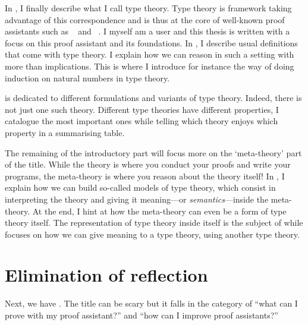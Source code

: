 In , I finally describe what I call type theory.
Type theory is framework taking advantage of this correspondence and is thus at
the core of well-known proof assistants such as \Coq~ and
\Agda~. I myself am a \Coq user and this
thesis is written with a focus on this proof assistant and its foundations.
In , I describe usual definitions that come with type theory.
I explain how we can reason in such a setting with more than implications.
%
This is where I introduce for instance the way of doing induction on natural
numbers in type theory.

 is dedicated to different formulations and variants of type
theory. Indeed, there is not just one such theory. Different type theories have
different properties, I catalogue the most important ones while telling which
theory enjoys which property in a summarising table.

The remaining of the introductory part will focus more on the `meta-theory'
part of the title. While the theory is where you conduct your proofs and write
your programs, the meta-theory is where you reason about the theory itself!
In , I explain how we can build so-called models of type theory,
which consist in interpreting the theory and giving it meaning---or
\emph{semantics}---inside the meta-theory. At the end, I hint at how the
meta-theory can even be a form of type theory itself. The representation of
type theory inside itself is the subject of  while
 focuses on how we can give meaning to a type theory, using
another type theory.

\section{Elimination of reflection}

Next, we have . The title can be scary but it falls in
the category of ``what can I prove with my proof assistant?'' and
``how can I improve proof assistants?''

